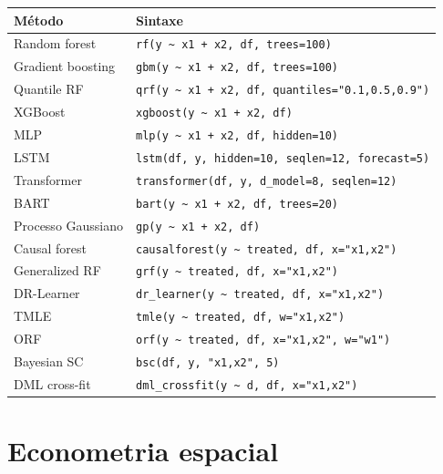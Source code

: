 \begin{center}
\begin{tabular}{ll}
\toprule
\textbf{Método} & \textbf{Sintaxe} \\
\midrule
Random forest       & \texttt{rf(y \textasciitilde{} x1 + x2, df, trees=100)} \\
Gradient boosting   & \texttt{gbm(y \textasciitilde{} x1 + x2, df, trees=100)} \\
Quantile RF         & \texttt{qrf(y \textasciitilde{} x1 + x2, df, quantiles="0.1,0.5,0.9")} \\
XGBoost             & \texttt{xgboost(y \textasciitilde{} x1 + x2, df)} \\
MLP                 & \texttt{mlp(y \textasciitilde{} x1 + x2, df, hidden=10)} \\
LSTM\textdagger{}                & \texttt{lstm(df, y, hidden=10, seqlen=12, forecast=5)} \\
Transformer\textdagger{}         & \texttt{transformer(df, y, d\_model=8, seqlen=12)} \\
BART                & \texttt{bart(y \textasciitilde{} x1 + x2, df, trees=20)} \\
Processo Gaussiano  & \texttt{gp(y \textasciitilde{} x1 + x2, df)} \\
\midrule
Causal forest       & \texttt{causalforest(y \textasciitilde{} treated, df, x="x1,x2")} \\
Generalized RF      & \texttt{grf(y \textasciitilde{} treated, df, x="x1,x2")} \\
DR-Learner          & \texttt{dr\_learner(y \textasciitilde{} treated, df, x="x1,x2")} \\
TMLE                & \texttt{tmle(y \textasciitilde{} treated, df, w="x1,x2")} \\
ORF                 & \texttt{orf(y \textasciitilde{} treated, df, x="x1,x2", w="w1")} \\
Bayesian SC         & \texttt{bsc(df, y, "x1,x2", 5)} \\
DML cross-fit       & \texttt{dml\_crossfit(y \textasciitilde{} d, df, x="x1,x2")} \\
\bottomrule
\end{tabular}
\end{center}

\section{Econometria espacial}

